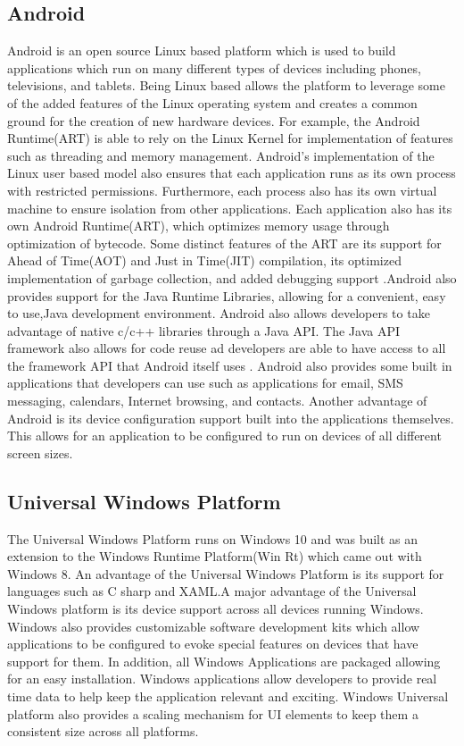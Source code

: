 \documentclass[onecolumn, draftclsnofoot,10pt, compsoc]{IEEEtran}
\begin{document}
       \subsection{Android}
       Android is an open source Linux based platform which is used to build applications which run on many different types of devices including phones, televisions, and tablets. \cite{Android} Being Linux based allows the platform to leverage some of the added features of the Linux operating system and creates a common ground for the creation of new hardware devices. For example, the Android Runtime(ART) is able to rely on the Linux Kernel for implementation of features such as threading and memory management. Android's implementation of the Linux user based model also ensures that each application runs as its own process with restricted permissions. Furthermore, each process also has its own virtual machine to ensure isolation from other applications. Each application also has its own Android Runtime(ART), which optimizes memory usage through optimization of bytecode. Some distinct features of the ART are its support for Ahead of Time(AOT) and Just in Time(JIT) compilation, its optimized implementation of garbage collection, and added debugging support .Android also provides support for the Java Runtime Libraries, allowing for a convenient, easy to use,Java development environment. Android also allows developers to take advantage of native c/c++ libraries through a Java API. The Java API framework also allows for code reuse ad developers are able to have access to all the framework API that Android itself uses . Android also provides some built in applications that developers can use such as applications for email, SMS messaging, calendars, Internet browsing, and contacts. Another advantage of Android is its device configuration support built into the applications themselves. This allows for an application to be configured to run on devices of all different screen sizes.
       \subsection{Universal Windows Platform}
       The Universal Windows Platform runs on Windows 10 and was built as an extension to the Windows Runtime Platform(Win Rt) which came out with Windows 8. \cite{Windows}An advantage of the Universal Windows Platform is its support for languages such as C sharp and XAML.A major advantage of the Universal Windows platform is its device support across all devices running Windows. Windows also provides customizable software development kits which allow applications to be configured to evoke special features on devices that have support for them. In addition, all Windows Applications are packaged allowing for an easy installation. Windows applications allow developers to provide real time data to help keep the application relevant and exciting. Windows Universal platform also provides a scaling mechanism for UI elements to keep them a consistent size across all platforms. 
\end{document}
